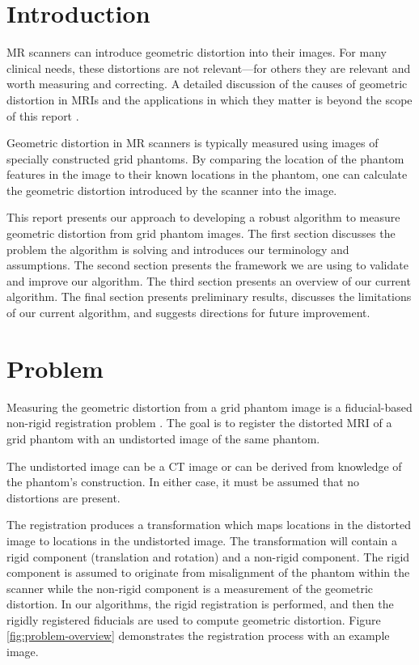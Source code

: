 \documentclass[12pt]{article}
\begin{document}
\maketitle

\section{Introduction}
MR scanners can introduce geometric distortion into their images.  For many clinical needs, these distortions are not relevant---for others they are relevant and worth measuring and correcting.  A detailed discussion of the causes of geometric distortion in MRIs and the applications in which they matter is beyond the scope of this report \cite{baldwin2007,torfeh2015,wang2005,mribook}.

Geometric distortion in MR scanners is typically measured using images of specially constructed grid phantoms. By comparing the location of the phantom features in the image to their known locations in the phantom, one can calculate the geometric distortion introduced by the scanner into the image.

This report presents our approach to developing a robust algorithm to measure geometric distortion from grid phantom images. The first section discusses the problem the algorithm is solving and introduces our terminology and assumptions.  The second section presents the framework we are using to validate and improve our algorithm.  The third section presents an overview of our current algorithm.  The final section presents preliminary results, discusses the limitations of our current algorithm, and suggests directions for future improvement.

\section{Problem}
Measuring the geometric distortion from a grid phantom image is a fiducial-based non-rigid registration problem \cite{hill2001}.  The goal is to register the distorted MRI of a grid phantom with an undistorted image of the same phantom.

The undistorted image can be a CT image or can be derived from knowledge of the phantom's construction. In either case, it must be assumed that no distortions are present.

The registration produces a transformation which maps locations in the distorted image to locations in the undistorted image.  The transformation will contain a rigid component (translation and rotation) and a non-rigid component.  The rigid component is assumed to originate from misalignment of the phantom within the scanner while the non-rigid component is a measurement of the geometric distortion.  In our algorithms, the rigid registration is performed, and then the rigidly registered fiducials are used to compute geometric distortion.  Figure \ref{fig:problem-overview} demonstrates the registration process with an example image.
\end{document}
